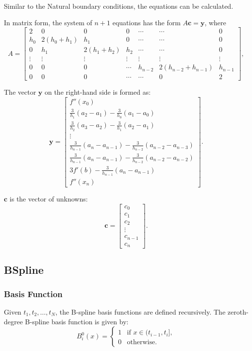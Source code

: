 \documentclass[a4paper]{article}
\begin{document}
\begin{sloppypar}
Similar to the Natural boundary conditions, the equations can be calculated.

In matrix form, the system of $n+1$ equations has the form $A\mathbf{c} = \mathbf{y}$, where
\[ A = \begin{bmatrix}
  2 & 0 & 0 & 0 & \cdots & \cdots& 0 \\
  h_0 & 2(h_0 + h_1) & h_1 & 0 & \cdots & \cdots& 0 \\
  0 & h_1 & 2(h_1 + h_2) & h_2 & \cdots & \cdots& 0 \\
  \vdots & \vdots & \vdots & \vdots & \vdots & \vdots& \vdots \\
  0 & 0 & 0 & \cdots &h_{n-2} & 2(h_{n-2} + h_{n-1}) & h_{n-1} \\
  0 & 0 & 0 & \cdots & \cdots& 0 & 2
  \end{bmatrix}, \]
  
  
  The vector \(\mathbf{y}\) on the right-hand side is formed as:
  \[
  \mathbf{y} = \begin{bmatrix}
    f''(x_0) \\
    \frac{3}{h_1}(a_2 - a_1) - \frac{3}{h_0}(a_1 - a_0) \\
    \frac{3}{h_2}(a_3 - a_2) - \frac{3}{h_1}(a_2 - a_1) \\
    \vdots \\
    \frac{3}{h_{n-1}}(a_n - a_{n-1}) - \frac{3}{h_{n-2}}(a_{n-2} - a_{n-3}) \\
    \frac{3}{h_{n-1}}(a_n - a_{n-1}) - \frac{3}{h_{n-2}}(a_{n-2} - a_{n-2}) \\
    3f'(b) - \frac{3}{h_{n-1}}(a_n - a_{n-1}) \\
    f''(x_n)
  \end{bmatrix}.
  \]
  
  \(\mathbf{c}\) is the vector of unknowns:
  \[
  \mathbf{c} = \begin{bmatrix}
  c_0 \\
  c_1 \\
  c_2 \\
  \vdots \\
  c_{n-1} \\
  c_n
  \end{bmatrix}.
  \]


\subsection{BSpline}
\subsubsection{Basis Function}
Given \( t_1, t_2, \ldots, t_{N} \), the B-spline basis functions are defined recursively. The zeroth-degree B-spline basis function is given by:
\[ B_i^0(x) = \begin{cases}
1 & \text{if } x \in (t_{i-1}, t_i], \\
0 & \text{otherwise.}
\end{cases} \]


\end{sloppypar}
\end{document}
